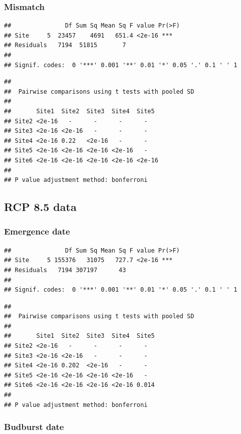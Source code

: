 \documentclass[12 pt]{article}
\begin{document}
\subsubsection*{Mismatch}

\begin{verbatim}
##               Df Sum Sq Mean Sq F value Pr(>F)    
## Site     5  23457    4691   651.4 <2e-16 ***
## Residuals   7194  51815       7                   
## 
## Signif. codes:  0 '***' 0.001 '**' 0.01 '*' 0.05 '.' 0.1 ' ' 1
\end{verbatim}

\begin{verbatim}
## 
##  Pairwise comparisons using t tests with pooled SD 
## 
##       Site1  Site2  Site3  Site4  Site5 
## Site2 <2e-16   -      -      -      -     
## Site3 <2e-16 <2e-16   -      -      -     
## Site4 <2e-16 0.22   <2e-16   -      -     
## Site5 <2e-16 <2e-16 <2e-16 <2e-16   -     
## Site6 <2e-16 <2e-16 <2e-16 <2e-16 <2e-16
## 
## P value adjustment method: bonferroni
\end{verbatim}

\subsection{RCP 8.5 data}
\subsubsection*{Emergence date}


\begin{verbatim}
##               Df Sum Sq Mean Sq F value Pr(>F)    
## Site     5 155376   31075   727.7 <2e-16 ***
## Residuals   7194 307197      43                   
## 
## Signif. codes:  0 '***' 0.001 '**' 0.01 '*' 0.05 '.' 0.1 ' ' 1
\end{verbatim}

\begin{verbatim}
## 
##  Pairwise comparisons using t tests with pooled SD 
## 
##       Site1  Site2  Site3  Site4  Site5
## Site2 <2e-16   -      -      -      -    
## Site3 <2e-16 <2e-16   -      -      -    
## Site4 <2e-16 0.202  <2e-16   -      -    
## Site5 <2e-16 <2e-16 <2e-16 <2e-16   -    
## Site6 <2e-16 <2e-16 <2e-16 <2e-16 0.014
## 
## P value adjustment method: bonferroni
\end{verbatim}

\subsubsection*{Budburst date}
\end{document}
